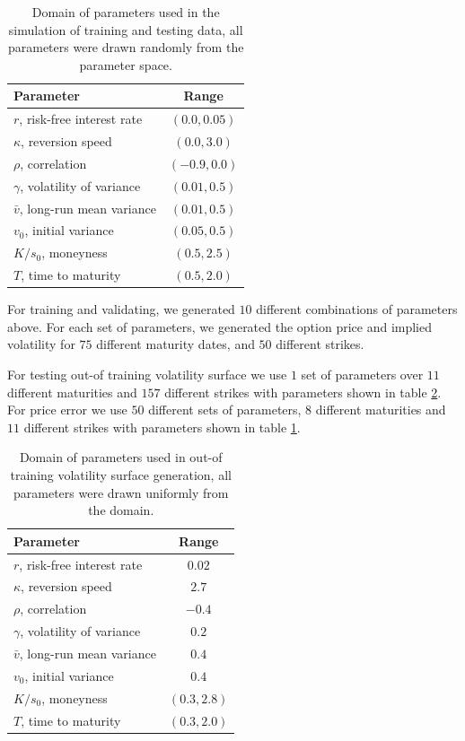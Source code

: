 \documentclass{article}
\theoremstyle{plain}%
\theoremstyle{definition}
\theoremstyle{remark}
\begin{document}
\begin{table}[htbp]
\centering
\caption{Domain of parameters used in the simulation of training and testing data, all parameters were drawn randomly from the parameter space.}
\begin{tabular}{l|c}
\hline
\textbf{Parameter} & \textbf{Range}\\
\hline
$r$, risk-free interest rate & $(0.0, 0.05)$\\
$\kappa$, reversion speed & $(0.0, 3.0)$\\
$\rho$, correlation & $(-0.9, 0.0)$\\
$\gamma$, volatility of variance & $(0.01, 0.5)$\\
$\bar{v}$, long-run mean variance & $(0.01, 0.5)$\\
$v_0$, initial variance & $(0.05, 0.5)$\\
$K/s_0$, moneyness & $(0.5, 2.5)$\\
$T$, time to maturity & $(0.5, 2.0)$\\
\hline
\end{tabular}
\label{tab:data_gen}
\end{table}
For training and validating, we generated $10$ different combinations of parameters above. For each set of parameters, we generated the option price and implied volatility for $75$ different maturity dates, and $50$ different strikes. 

For testing out-of training volatility surface we use $1$ set of parameters over $11$ different maturities and $157$ different strikes with parameters shown in table \ref{tab:data_gen_out}. For price error we use $50$ different sets of parameters, $8$ different maturities and $11$ different strikes with parameters shown in table \ref{tab:data_gen}.

\begin{table}[htbp]
\centering
\caption{Domain of parameters used in out-of training volatility surface generation, all parameters were drawn uniformly from the domain.}
\begin{tabular}{l|c}
\hline
\textbf{Parameter} & \textbf{Range}\\
\hline
$r$, risk-free interest rate & $0.02$\\
$\kappa$, reversion speed & $2.7$\\
$\rho$, correlation &$ -0.4$\\
$\gamma$, volatility of variance & $0.2$\\
$\bar{v}$, long-run mean variance & $0.4$\\
$v_0$, initial variance & $0.4$\\
$K/s_0$, moneyness & $(0.3, 2.8)$\\
$T$, time to maturity & $(0.3,2.0)$\\
\hline
\end{tabular}
\label{tab:data_gen_out}
\end{table}
\end{document}

